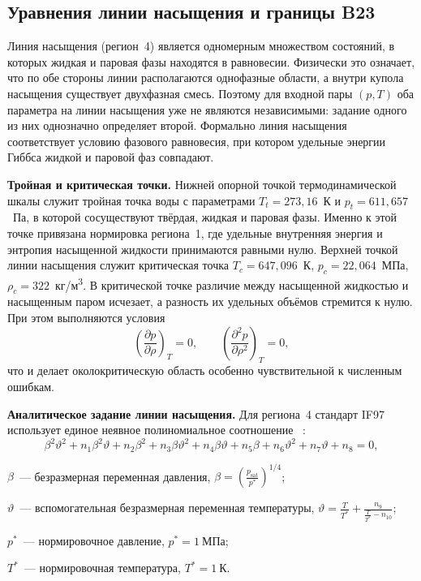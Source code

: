 \subsection{Уравнения линии насыщения и границы B23}

	Линия насыщения (регион~4) является одномерным множеством состояний,
в которых жидкая и паровая фазы находятся в равновесии.
Физически это означает,
что по обе стороны линии располагаются однофазные области,
а внутри купола насыщения существует двухфазная смесь.
Поэтому для входной пары $(p, T)$
оба параметра на линии насыщения уже не являются независимыми:
задание одного из них однозначно определяет второй.
Формально линия насыщения соответствует условию фазового равновесия,
при котором удельные энергии Гиббса жидкой и паровой фаз совпадают.

\textbf{Тройная и критическая точки.}
	Нижней опорной точкой термодинамической шкалы
	служит тройная точка воды
	с параметрами $T_{t}=273{,}16$~К и $p_{t}=611{,}657$~Па,
	в которой сосуществуют твёрдая, жидкая и паровая фазы.
	Именно к этой точке привязана нормировка региона~1,
где удельные внутренняя энергия и энтропия
насыщенной жидкости принимаются равными нулю.
	Верхней точкой линии насыщения
	служит критическая точка
	$T_{c}=647{,}096$~К,
	$p_{c}=22{,}064$~МПа,
	$\rho_{c}=322$~кг/м\textsuperscript{3}.
В критической точке различие между насыщенной жидкостью
и насыщенным паром исчезает,
а разность их удельных объёмов стремится к нулю.
При этом выполняются условия
\begin{equation}
\left(\frac{\partial p}{\partial \rho}\right)_{T} = 0,
\qquad
\left(\frac{\partial^{2} p}{\partial \rho^{2}}\right)_{T} = 0,
\end{equation}
что и делает околокритическую область
особенно чувствительной к численным ошибкам.

\textbf{Аналитическое задание линии насыщения.}
Для региона~4 стандарт IF97 использует единое неявное полиномиальное соотношение
~\cite{iapws_if97_2012}:
\begin{equation}
\beta^{2}\vartheta^{2}
+ n_{1}\beta^{2}\vartheta
+ n_{2}\beta^{2}
+ n_{3}\beta\vartheta^{2}
+ n_{4}\beta\vartheta
+ n_{5}\beta
+ n_{6}\vartheta^{2}
+ n_{7}\vartheta
+ n_{8}
= 0,
\end{equation}
\begin{gostwhere}
  \item $\beta$~--- безразмерная переменная давления, $\beta = \left(\frac{p_{\mathrm{sat}}}{p^{*}}\right)^{1/4}$;
  \item $\vartheta$~--- вспомогательная безразмерная переменная температуры, $\vartheta = \frac{T}{T^{*}} + \frac{n_{9}}{\frac{T}{T^{*}} - n_{10}}$;
  \item $p^{*}$~--- нормировочное давление, $p^{*}=1~\mbox{МПа}$;
  \item $T^{*}$~--- нормировочная температура, $T^{*}=1~\mbox{К}$.
\end{gostwhere}

